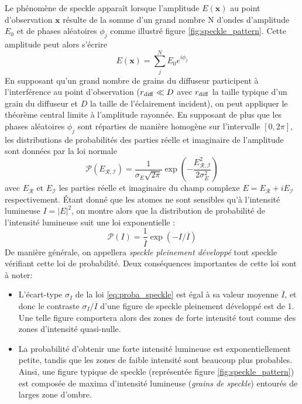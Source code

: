 Le phénomène de speckle apparaît lorsque l'amplitude $E(\mathbf{x})$ au point d'observation $\mathbf{x}$ résulte de la somme d'un grand nombre N d'ondes d'amplitude $E_0$ et de phases aléatoires $\phi_j$ comme illustré figure \ref{fig:speckle_pattern}. Cette amplitude peut alors s'écrire
\begin{equation}
E(\mathbf{x})=\sum_{j}^{N} E_0 e^{i \phi_j}
\end{equation}
En supposant qu'un grand nombre de grains du diffuseur participent à l'interférence au point d'observation ($r_{\mathrm{diff}} \ll D$ avec $r_{\mathrm{diff}}$ la taille typique d'un grain du diffuseur et $D$ la taille de l'éclairement incident), on peut appliquer le théorème central limite à l'amplitude rayonnée. En supposant de plus que les phases aléatoires $\phi_j$ sont réparties de manière homogène sur l'intervalle $\left[ 0,2\pi \right]$, les distributions de probabilités des parties réelle et imaginaire de l'amplitude sont données par la loi normale
\begin{equation}
\mathcal{P}(E_{\mathcal{R,I}})=\frac{1}{\sigma_E\sqrt{2\pi}} \exp{\left( -\frac{E_{\mathcal{R,I}}^2}{2 \sigma_E^2}\right) }
\end{equation}
avec $E_{\mathcal{R}}$ et $E_{\mathcal{I}}$ les parties réelle et imaginaire du champ complexe $E=E_{\mathcal{R}} +i E_{\mathcal{I}}$ respectivement. Étant donné que les atomes ne sont sensibles qu'à l'intensité lumineuse $I=\left| E \right| ^2$, on montre alors que la distribution de probabilité de l'intensité lumineuse suit une loi exponentielle \citep{goodman2007speckle}:
\begin{equation}
\mathcal{P}(I)=\frac{1}{\overline{I}}\exp{\left( -I/\overline{I} \right) }
\label{eq:proba_speckle}
\end{equation}
De manière générale, on appellera \emph{speckle pleinement développé} tout speckle vérifiant cette loi de probabilité. Deux conséquences importantes de cette loi sont à noter:
\begin{itemize}
\item[\textendash] L'écart-type $\sigma_I$ de la loi \ref{eq:proba_speckle} est égal à sa valeur moyenne $\overline{I}$, et donc le contraste $\sigma_I /\overline{I}$ d'une figure de speckle pleinement développé est de 1. Une telle figure comportera alors des zones de forte intensité tout comme des zones d'intensité quasi-nulle. 
\item[\textendash] La probabilité d'obtenir une forte intensité lumineuse est exponentiellement petite, tandis que les zones de faible intensité sont beaucoup plus probables. Ainsi, une figure typique de speckle (représentée figure \ref{fig:speckle_pattern}) est composée de maxima d'intensité lumineuse (\emph{grains de speckle}) entourés de larges zone d'ombre.
\end{itemize}





